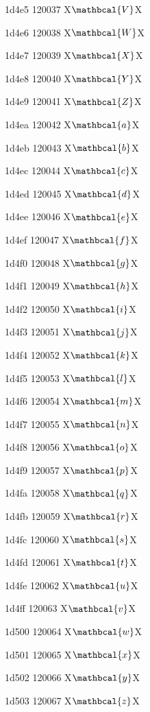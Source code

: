 \documentclass[11pt]{article}
\begin{document}
1d4e5 120037 X{\ensuremath{\mathbcal{V}}}X

1d4e6 120038 X{\ensuremath{\mathbcal{W}}}X

1d4e7 120039 X{\ensuremath{\mathbcal{X}}}X

1d4e8 120040 X{\ensuremath{\mathbcal{Y}}}X

1d4e9 120041 X{\ensuremath{\mathbcal{Z}}}X

1d4ea 120042 X{\ensuremath{\mathbcal{a}}}X

1d4eb 120043 X{\ensuremath{\mathbcal{b}}}X

1d4ec 120044 X{\ensuremath{\mathbcal{c}}}X

1d4ed 120045 X{\ensuremath{\mathbcal{d}}}X

1d4ee 120046 X{\ensuremath{\mathbcal{e}}}X

1d4ef 120047 X{\ensuremath{\mathbcal{f}}}X

1d4f0 120048 X{\ensuremath{\mathbcal{g}}}X

1d4f1 120049 X{\ensuremath{\mathbcal{h}}}X

1d4f2 120050 X{\ensuremath{\mathbcal{i}}}X

1d4f3 120051 X{\ensuremath{\mathbcal{j}}}X

1d4f4 120052 X{\ensuremath{\mathbcal{k}}}X

1d4f5 120053 X{\ensuremath{\mathbcal{l}}}X

1d4f6 120054 X{\ensuremath{\mathbcal{m}}}X

1d4f7 120055 X{\ensuremath{\mathbcal{n}}}X

1d4f8 120056 X{\ensuremath{\mathbcal{o}}}X

1d4f9 120057 X{\ensuremath{\mathbcal{p}}}X

1d4fa 120058 X{\ensuremath{\mathbcal{q}}}X

1d4fb 120059 X{\ensuremath{\mathbcal{r}}}X

1d4fc 120060 X{\ensuremath{\mathbcal{s}}}X

1d4fd 120061 X{\ensuremath{\mathbcal{t}}}X

1d4fe 120062 X{\ensuremath{\mathbcal{u}}}X

1d4ff 120063 X{\ensuremath{\mathbcal{v}}}X

1d500 120064 X{\ensuremath{\mathbcal{w}}}X

1d501 120065 X{\ensuremath{\mathbcal{x}}}X

1d502 120066 X{\ensuremath{\mathbcal{y}}}X

1d503 120067 X{\ensuremath{\mathbcal{z}}}X
\end{document}
